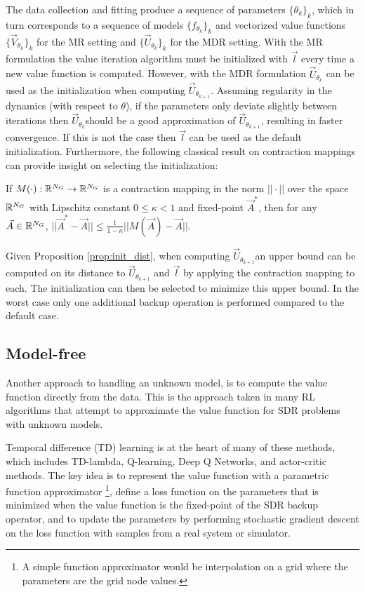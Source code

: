 The data collection and fitting produce a sequence of parameters $\{\theta_k\}_k$, which in turn corresponds to a sequence of models $\{f_{\theta_k}\}_k$ and vectorized value functions $\{\vec{V}_{\theta_k}\}_k$ for the MR setting and $\{\vec{U}_{\theta_k}\}_k$ for the MDR setting. With the MR formulation the value iteration algorithm must be initialized with $\vec{l}$ every time a new value function is computed. However, with the MDR formulation $\vec{U}_{\theta_k}$ can be used as the initialization when computing $\vec{U}_{\theta_{k+1}}$. Assuming regularity in the dynamics (with respect to $\theta$), if the parameters only deviate slightly between iterations then $\vec{U}_{\theta_{k}}$should be a good approximation of $\vec{U}_{\theta_{k+1}}$, resulting in faster convergence. If this is not the case then $\vec{l}$ can be used as the default initialization. Furthermore, the following classical result on contraction mappings can provide insight on selecting the initialization:  
%
\begin{proposition} \label{prop:init_dist}
If $M(\cdot): \mathbb{R}^{N_G} \rightarrow \mathbb{R}^{N_G}$ is a contraction mapping in the norm $|| \cdot ||$ over the space $\mathbb{R}^{N_G}$ with Lipschitz constant $0\leq \kappa < 1$ and fixed-point $\vec{A}^*$, then for any ${\vec{A} \in \mathbb{R}^{N_G}}$,  ${||\vec{A}^* - \vec{A}|| \leq \frac{1}{1-\kappa}||M(\vec{A}) - \vec{A}||}$. 
\end{proposition}

Given Proposition \ref{prop:init_dist}, when computing $\vec{U}_{\theta_{k+1}}$an upper bound can be computed on its distance to $\vec{U}_{\theta_{k+1}}$ and $\vec{l}$ by applying the contraction mapping to each. The initialization can then be selected to minimize this upper bound. In the worst case only one additional backup operation is performed compared to the default case. 

\subsection{Model-free}

Another approach to handling an unknown model, is to compute the value function directly from the data. This is the approach taken in many RL algorithms that attempt to approximate the value function for SDR problems with unknown models.

Temporal difference (TD) learning is at the heart of many of these methods, which includes TD-lambda\cite{Sutton1988}, Q-learning\cite{Watkins1992}, Deep Q Networks\cite{Mnih2016}, and actor-critic methods\cite{Konda2000}. The key idea is to represent the value function with a parametric function approximator \footnote{A simple function approximator would be interpolation on a grid where the parameters are the grid node values.}, define a loss function on the parameters that is minimized when the value function is the fixed-point of the SDR backup operator, and to update the parameters by performing stochastic gradient descent on the loss function with samples from a real system or simulator.

